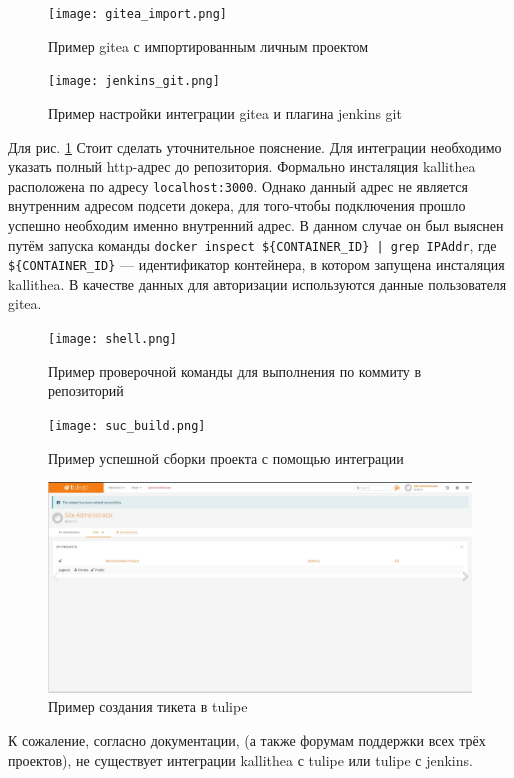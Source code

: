 \documentclass[a4paper]{extarticle}
\begin{document}
\begin{figure}[H]
\texttt{[image: gitea\_import.png]}
\caption{Пример gitea с импортированным личным проектом}
\end{figure}

\begin{figure}[H]
\texttt{[image: jenkins\_git.png]}
\caption{Пример настройки интеграции gitea и плагина jenkins git}
\label{fig:git}
\end{figure}

Для рис. \ref{fig:git} Стоит сделать уточнительное пояснение. Для интеграции необходимо указать полный http-адрес до репозитория. Формально инсталяция kallithea расположена по адресу \texttt{localhost:3000}. Однако данный адрес не является внутренним адресом подсети докера, для того-чтобы подключения прошло успешно необходим именно внутренний адрес. В данном случае он был выяснен путём запуска команды
\verb#docker inspect ${CONTAINER_ID} | grep IPAddr#, где \verb#${CONTAINER_ID}# --- идентификатор контейнера, в котором запущена инсталяция kallithea. В качестве данных  для авторизации используются данные пользователя gitea.

\begin{figure}[H]
\texttt{[image: shell.png]}
\caption{Пример проверочной команды для выполнения по коммиту в репозиторий}
\end{figure}

\begin{figure}[H]
\texttt{[image: suc\_build.png]}
\caption{Пример успешной сборки проекта с помощью интеграции}
\end{figure}

\begin{figure}[H]
\includegraphics[width=\textwidth,height=\textheight,keepaspectratio]{tulipe.png}
\caption{Пример создания тикета в tulipe}
\end{figure}

К сожаление, согласно документации, (а также  форумам поддержки всех трёх проектов), не существует интеграции kallithea с tulipe или tulipe с jenkins.
\end{document}
